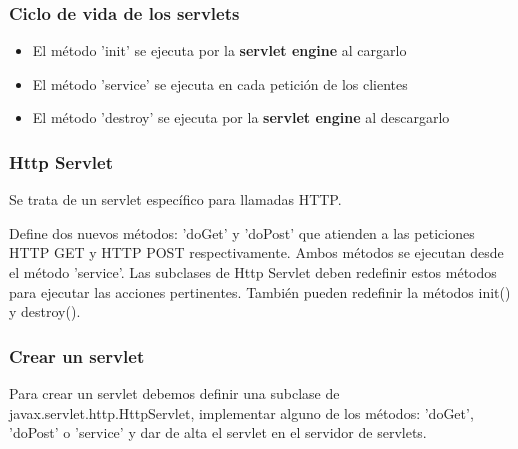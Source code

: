 \documentclass{apuntes}
\begin{document}
\subsubsection{Ciclo de vida de los servlets}
\begin{itemize}
\item El método 'init' se ejecuta por la \textbf{servlet engine} al cargarlo
\item El método 'service' se ejecuta en cada petición de los clientes
\item El método 'destroy' se ejecuta por la \textbf{servlet engine} al descargarlo
\end{itemize}

\subsubsection{Http Servlet}
Se trata de un servlet específico para llamadas HTTP.

Define dos nuevos métodos: 'doGet' y 'doPost' que atienden a las peticiones HTTP GET y HTTP POST respectivamente. Ambos métodos se ejecutan desde el método 'service'. Las subclases de Http Servlet deben redefinir estos métodos para ejecutar las acciones pertinentes. También pueden redefinir la métodos init() y destroy().

\subsubsection{Crear un servlet}
Para crear un servlet debemos definir una subclase de javax.servlet.http.HttpServlet, implementar alguno de los métodos: 'doGet', 'doPost' o 'service' y dar de alta el servlet en el servidor de servlets.
\end{document}
